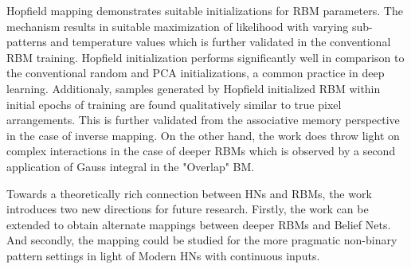 \documentclass[11pt,letterpaper]{article}
\begin{document}
Hopfield mapping demonstrates suitable initializations for RBM parameters. The mechanism results in suitable maximization of likelihood with varying sub-patterns and temperature values which is further validated in the conventional RBM training. Hopfield initialization performs significantly well in comparison to the conventional random and PCA initializations, a common practice in deep learning. Additionaly, samples generated by Hopfield initialized RBM within initial epochs of training are found qualitatively similar to true pixel arrangements. This is further validated from the associative memory perspective in the case of inverse mapping. On the other hand, the work does throw light on complex interactions in the case of deeper RBMs which is observed by a second application of Gauss integral in the "Overlap" BM. 

Towards a theoretically rich connection between HNs and RBMs, the work introduces two new directions for future research. Firstly, the work can be extended to obtain alternate mappings between deeper RBMs and Belief Nets. And secondly, the mapping could be studied for the more pragmatic non-binary pattern settings in light of Modern HNs with continuous inputs.
\end{document}
